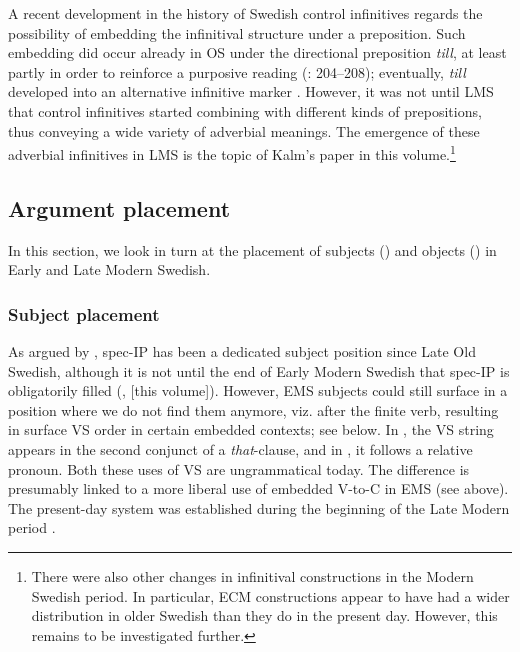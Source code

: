 \documentclass[output=paper]{langscibook}
\begin{document}
A recent development in the history of Swedish control infinitives regards the possibility of embedding the infinitival structure under a preposition. Such embedding did occur already in OS under the directional preposition \textit{till}, at least partly in order to reinforce a purposive reading (\citealt{Kalm2016Satsekvivalenta}: 204–208); eventually, \textit{till} developed into an alternative infinitive marker \citep[210]{Kalm2016Satsekvivalenta}. However, it was not until LMS that control infinitives started combining with different kinds of prepositions, thus conveying a wide variety of adverbial meanings. The emergence of these adverbial infinitives in LMS is the topic of Kalm’s paper in this volume.\footnote{There were also other changes in infinitival constructions in the Modern Swedish period. In particular, ECM constructions appear to have had a wider distribution in older Swedish than they do in the present day. However, this remains to be investigated further.}


\subsection{ Argument placement}\label{sec:intro:3.2}


In this section, we look in turn at the placement of subjects () and objects () in Early and Late Modern Swedish.


\subsubsection{Subject placement}\label{sec:intro:3.2.1}


As argued by \textcite{Hakansson2008}, spec-IP has been a dedicated subject position since Late Old Swedish, although it is not until the end of Early Modern Swedish that spec-IP is obligatorily filled (\citealt{Falk1993}, \citeyear{chapters/02} [this volume]). However, EMS subjects could still surface in a position where we do not find them anymore, viz. after the finite verb, resulting in surface VS order in certain embedded contexts; see  below. In , the VS string appears in the second conjunct of a \textit{that}{}-clause, and in , it follows a relative pronoun. Both these uses of VS are ungrammatical today. The difference is presumably linked to a more liberal use of embedded V-to-C in EMS (see  above). The present-day system was established during the beginning of the Late Modern period \citep{Petzell2013}.
\end{document}
